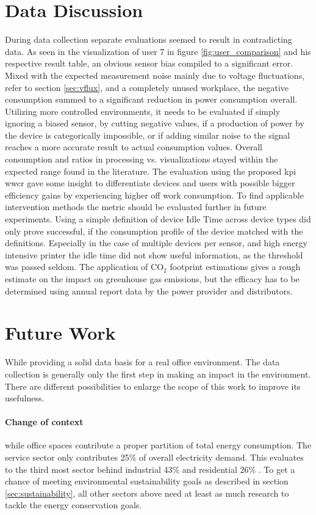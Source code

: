 \section{Data Discussion}\label{sec:datadisscussion}
During data collection separate evaluations seemed to result in contradicting data. As seen in the visualization of user 7 in figure \ref{fig:user_comparison} and his respective result table, an obvious sensor bias compiled to a significant error. Mixed with the expected measurement noise mainly due to voltage fluctuations, refer to section \ref{sec:vflux}, and a completely unused workplace, the negative consumption summed to a significant reduction in power consumption overall. Utilizing more controlled environments, it needs to be evaluated if simply ignoring a biased sensor, by cutting negative values, if a production of power by the device is categorically impossible, or if adding similar noise to the signal reaches a more accurate result to actual consumption values. Overall consumption and ratios in processing vs. visualizations stayed within the expected range found in the literature. The evaluation using the proposed \gls{kpi} \acrfull{wwcr} gave some insight to differentiate devices and users with possible bigger efficiency gains by experiencing higher off work consumption. To find applicable intervention methods the metric should be evaluated further in future experiments. Using a simple definition of device Idle Time across device types did only prove successful, if the consumption profile of the device matched with the definitions. Especially in the case of multiple devices per sensor, and high energy intensive printer the idle time did not show useful information, as the threshold was passed seldom. The application of CO$_2$ footprint estimations gives a rough estimate on the impact on greenhouse gas emissions, but the efficacy has to be determined using annual report data by the power provider and distributors.

\section{Future Work}
While providing a solid data basis for a real office environment. The data collection is generally only the first step in making an impact in the environment. There are different possibilities to enlarge the scope of this work to improve its usefulness.
\paragraph{Change of context}while office spaces contribute a proper partition of total energy consumption. The service sector only contributes 25\% of overall electricity demand. This evaluates to the third most sector behind industrial 43\% and residential 26\% \cite{enerdata}. To get a chance of meeting environmental sustainability goals as described in section \ref{sec:sustainability}, all other sectors above need at least as much research to tackle the energy conservation goals.
